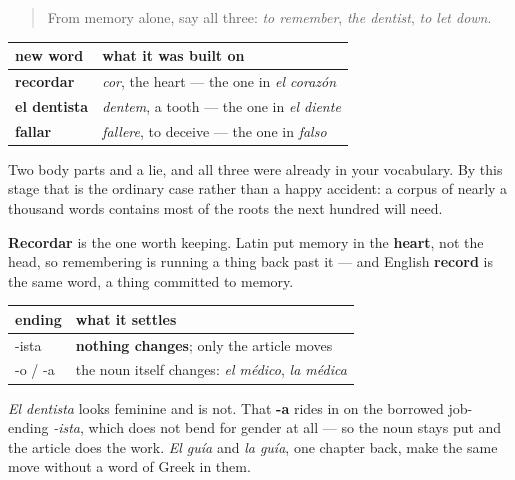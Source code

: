 \begin{quote}
From memory alone, say all three: \emph{to remember}, \emph{the dentist}, \emph{to let down}.
\end{quote}

\begin{grammarlens}[title={Grammar Lens: two bodies and a lie}]
\noindent
\begin{tabularx}{\linewidth}{@{}>{\raggedright\arraybackslash}X>{\raggedright\arraybackslash}X@{}}
\toprule
\textbf{new word} & \textbf{what it was built on} \\
\midrule
\textbf{recordar} & \emph{cor}, the heart — the one in \emph{el corazón} \\
\textbf{el dentista} & \emph{dentem}, a tooth — the one in \emph{el diente} \\
\textbf{fallar} & \emph{fallere}, to deceive — the one in \emph{falso} \\
\bottomrule
\end{tabularx}

Two body parts and a lie, and all three were already in your vocabulary. By this stage that is the ordinary case rather than a happy accident: a corpus of nearly a thousand words contains most of the roots the next hundred will need.

\textbf{Recordar} is the one worth keeping. Latin put memory in the \textbf{heart}, not the head, so remembering is running a thing back past it — and English \textbf{record} is the same word, a thing committed to memory.
\end{grammarlens}

\begin{grammarlens}[title={Grammar Lens: endings that fix the article, and one that does not}]
\noindent
\begin{tabularx}{\linewidth}{@{}>{\raggedright\arraybackslash}X>{\raggedright\arraybackslash}X@{}}
\toprule
\textbf{ending} & \textbf{what it settles} \\
\midrule
-ista & \textbf{nothing changes}; only the article moves \\
-o / -a & the noun itself changes: \emph{el médico}, \emph{la médica} \\
\bottomrule
\end{tabularx}

\emph{El dentista} looks feminine and is not. That \textbf{-a} rides in on the borrowed job-ending \emph{-ista}, which does not bend for gender at all — so the noun stays put and the article does the work. \emph{El guía} and \emph{la guía}, one chapter back, make the same move without a word of Greek in them.
\end{grammarlens}

